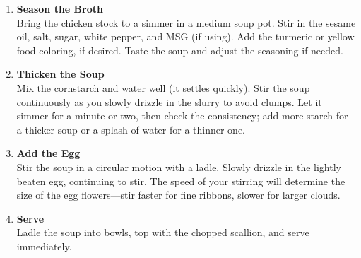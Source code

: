 \begin{enumerate}

      \item \textbf{Season the Broth} \\
            Bring the chicken stock to a simmer in a medium soup pot. Stir in the sesame oil, salt, sugar, white pepper, and MSG (if using). Add the turmeric or yellow food coloring, if desired. Taste the soup and adjust the seasoning if needed.

      \item \textbf{Thicken the Soup} \\
            Mix the cornstarch and water well (it settles quickly). Stir the soup continuously as you slowly drizzle in the slurry to avoid clumps. Let it simmer for a minute or two, then check the consistency; add more starch for a thicker soup or a splash of water for a thinner one.

      \item \textbf{Add the Egg} \\
            Stir the soup in a circular motion with a ladle. Slowly drizzle in the lightly beaten egg, continuing to stir. The speed of your stirring will determine the size of the egg flowers—stir faster for fine ribbons, slower for larger clouds.

      \item \textbf{Serve} \\
            Ladle the soup into bowls, top with the chopped scallion, and serve immediately.

\end{enumerate}

